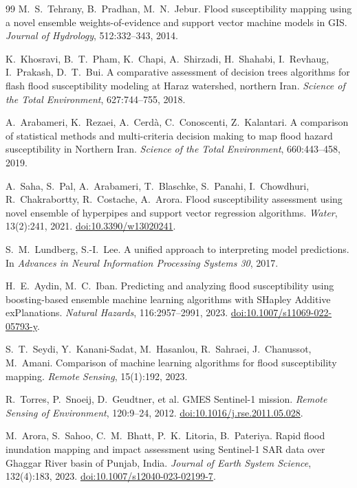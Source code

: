 \documentclass[11pt,a4paper]{article}
\begin{document}
\begin{thebibliography}{99}
M.~S.~Tehrany, B.~Pradhan, M.~N.~Jebur.
Flood susceptibility mapping using a novel ensemble weights-of-evidence and
support vector machine models in GIS.
\emph{Journal of Hydrology}, 512:332--343, 2014.

K.~Khosravi, B.~T.~Pham, K.~Chapi, A.~Shirzadi, H.~Shahabi, I.~Revhaug,
I.~Prakash, D.~T.~Bui.
A comparative assessment of decision trees algorithms for flash flood
susceptibility modeling at Haraz watershed, northern Iran.
\emph{Science of the Total Environment}, 627:744--755, 2018.

A.~Arabameri, K.~Rezaei, A.~Cerd\`a, C.~Conoscenti, Z.~Kalantari.
A comparison of statistical methods and multi-criteria decision making to map
flood hazard susceptibility in Northern Iran.
\emph{Science of the Total Environment}, 660:443--458, 2019.

A.~Saha, S.~Pal, A.~Arabameri, T.~Blaschke, S.~Panahi, I.~Chowdhuri,
R.~Chakrabortty, R.~Costache, A.~Arora.
Flood susceptibility assessment using novel ensemble of hyperpipes and support
vector regression algorithms.
\emph{Water}, 13(2):241, 2021.
\href{https://doi.org/10.3390/w13020241}{doi:10.3390/w13020241}.

S.~M.~Lundberg, S.-I.~Lee.
A unified approach to interpreting model predictions.
In \emph{Advances in Neural Information Processing Systems 30}, 2017.

H.~E.~Aydin, M.~C.~Iban.
Predicting and analyzing flood susceptibility using boosting-based ensemble
machine learning algorithms with SHapley Additive exPlanations.
\emph{Natural Hazards}, 116:2957--2991, 2023.
\href{https://doi.org/10.1007/s11069-022-05793-y}{doi:10.1007/s11069-022-05793-y}.

S.~T.~Seydi, Y.~Kanani-Sadat, M.~Hasanlou, R.~Sahraei, J.~Chanussot,
M.~Amani.
Comparison of machine learning algorithms for flood susceptibility mapping.
\emph{Remote Sensing}, 15(1):192, 2023.

R.~Torres, P.~Snoeij, D.~Geudtner, et al.
GMES Sentinel-1 mission.
\emph{Remote Sensing of Environment}, 120:9--24, 2012.
\href{https://doi.org/10.1016/j.rse.2011.05.028}{doi:10.1016/j.rse.2011.05.028}.

M.~Arora, S.~Sahoo, C.~M.~Bhatt, P.~K.~Litoria, B.~Pateriya.
Rapid flood inundation mapping and impact assessment using Sentinel-1 SAR data
over Ghaggar River basin of Punjab, India.
\emph{Journal of Earth System Science}, 132(4):183, 2023.
\href{https://doi.org/10.1007/s12040-023-02199-7}{doi:10.1007/s12040-023-02199-7}.


\end{thebibliography}
\end{document}
